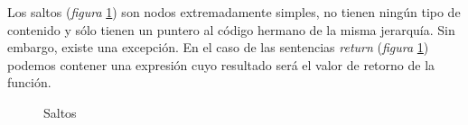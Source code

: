 \documentclass[a4paper,10pt]{article}
\begin{document}
Los saltos (\emph{figura} \ref{fig:saltos}) son nodos extremadamente simples, no tienen ningún tipo de contenido y sólo tienen un puntero al código hermano de la misma jerarquía. Sin embargo, existe una excepción. En el caso de las sentencias \textit{return} (\emph{figura} \ref{fig:saltos}) podemos contener una expresión cuyo resultado será el valor de retorno de la función.
\begin{figure}[H]
  \centering
  \caption{Saltos}
  \label{fig:saltos}
\end{figure}
\end{document}
